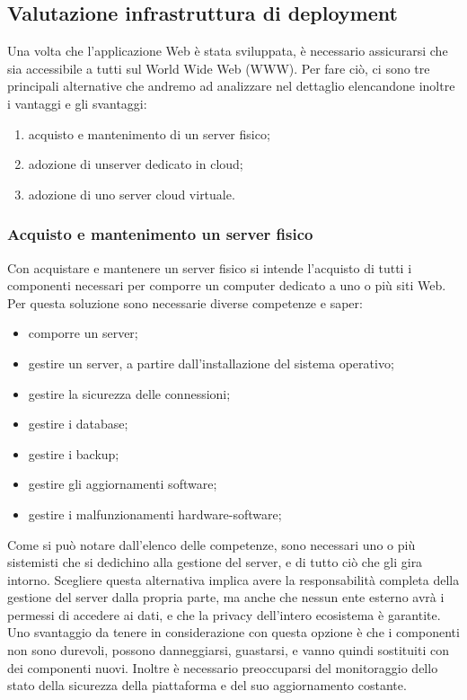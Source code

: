 \documentclass[12pt,a4paper]{article}
\begin{document}
\subsection{Valutazione infrastruttura di deployment}
Una volta che l’applicazione Web è stata sviluppata, è necessario assicurarsi che sia accessibile a tutti sul World Wide Web (WWW). Per fare ciò, ci sono tre principali alternative che andremo ad analizzare nel dettaglio elencandone inoltre i vantaggi e gli svantaggi:
\begin{enumerate}
    \item acquisto e mantenimento di un server fisico;
    \item adozione di unserver dedicato in cloud;
    \item adozione di uno server cloud virtuale.
\end{enumerate}
\subsubsection{Acquisto e mantenimento un server fisico}
Con acquistare e mantenere un server fisico si intende l’acquisto di tutti i componenti necessari per comporre un computer dedicato a uno o più siti Web. Per questa soluzione sono necessarie diverse competenze e saper:
\begin{itemize}
    \item comporre un server;
    \item gestire un server, a partire dall’installazione del sistema operativo;
    \item gestire la sicurezza delle connessioni;
    \item gestire i database;
    \item gestire i backup;
    \item gestire gli aggiornamenti software;
    \item gestire i malfunzionamenti hardware-software;
\end{itemize}

Come si può notare dall’elenco delle competenze, sono necessari uno o più sistemisti che si dedichino alla gestione del server, e di tutto ciò che gli gira intorno.
Scegliere questa alternativa implica avere la responsabilità completa della gestione del server dalla propria parte, ma anche che nessun ente esterno avrà i permessi di accedere ai dati, e che la privacy dell’intero ecosistema è garantite. Uno svantaggio da tenere in considerazione con questa opzione è che i componenti non sono durevoli, possono danneggiarsi, guastarsi, e vanno quindi sostituiti con dei componenti nuovi. Inoltre è necessario preoccuparsi del monitoraggio dello stato della sicurezza della piattaforma e del suo aggiornamento costante.
\end{document}
